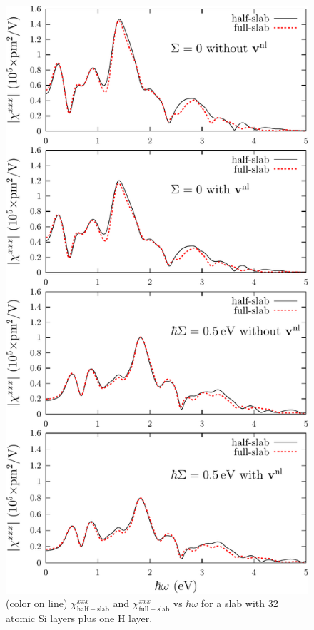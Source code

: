 \documentclass[floatfix,prb,aps,superscriptaddress,11pt,preprint,letterpaper]{revtex4}
\begin{document}
\begin{figure}
\centering 
\includegraphics[scale=.8]{plots/fig2}
\caption{(color on line) 
$\chi^{xxx}_{\mathrm{half-slab}}$
and 
$\chi^{xxx}_{\mathrm{full-slab}}$
vs $\hbar\omega$ for a slab with 32 
atomic Si layers plus one H layer. 
\label{fig2}} 
\end{figure}
\end{document}
